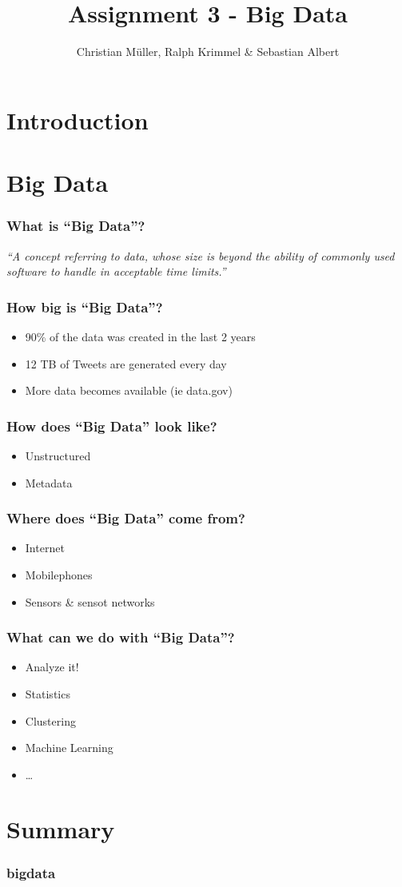 \documentclass{beamer}
\title{Assignment 3 - Big Data}
\author{Christian Müller, Ralph Krimmel \& Sebastian Albert}
\begin{document}

\section{Introduction}
\begin{frame}
	\maketitle
\end{frame}

\section{Big Data}
\begin{frame}
	\frametitle{What is ``Big Data''?}
		\huge
		\textsl{``A concept referring to data,
		whose size is beyond the ability of commonly used software to handle in acceptable time limits.''}
\end{frame}

\begin{frame}
	\frametitle{How big is ``Big Data''?}
		\begin{itemize}
			\item 90\% of the data was created in the last 2 years
			\item 12 TB of Tweets are generated every day
			\item More data becomes available (ie data.gov)
		\end{itemize}
\end{frame}

\begin{frame}
	\frametitle{How does ``Big Data'' look like?}
	\begin{itemize}
		\item Unstructured
		\item Metadata
	\end{itemize}
\end{frame}

\begin{frame}
	\frametitle{Where does ``Big Data'' come from?}
	\begin{itemize}
		\item Internet
		\item Mobilephones
		\item Sensors \& sensot networks
	\end{itemize}
\end{frame}

\begin{frame}
	\frametitle{What can we do with ``Big Data''?}
		\begin{itemize}
			\item Analyze it!
			\item Statistics
			\item Clustering
			\item Machine Learning
			\item \ldots
		\end{itemize}
\end{frame}

\section{Summary}
\begin{frame}
	\frametitle{bigdata}
\end{frame}
\end{document}
